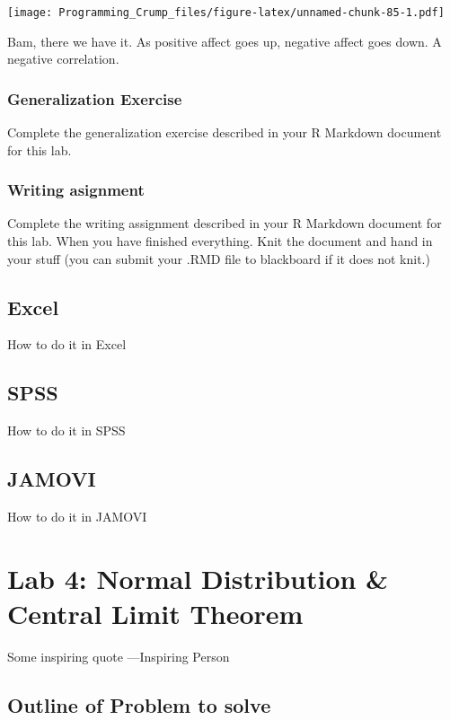 \documentclass[]{book}
\theoremstyle{definition}
\theoremstyle{definition}
\theoremstyle{definition}
\theoremstyle{remark}
\begin{document}
\texttt{[image: Programming\_Crump\_files/figure-latex/unnamed-chunk-85-1.pdf]}

Bam, there we have it. As positive affect goes up, negative affect goes
down. A negative correlation.

\subsection{Generalization Exercise}\label{generalization-exercise-1}

Complete the generalization exercise described in your R Markdown
document for this lab.

\subsection{Writing asignment}\label{writing-asignment-1}

Complete the writing assignment described in your R Markdown document
for this lab. When you have finished everything. Knit the document and
hand in your stuff (you can submit your .RMD file to blackboard if it
does not knit.)

\section{Excel}\label{excel-2}

How to do it in Excel

\section{SPSS}\label{spss-2}

How to do it in SPSS

\section{JAMOVI}\label{jamovi-2}

How to do it in JAMOVI

\chapter{Lab 4: Normal Distribution \& Central Limit
Theorem}\label{lab-4-normal-distribution-central-limit-theorem}

{ Some inspiring quote ---Inspiring Person }

\section{Outline of Problem to
solve}\label{outline-of-problem-to-solve-2}
\end{document}
